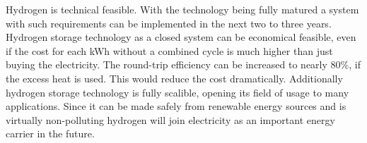 \documentclass[12pt,a4paper]{article}
\begin{document}
\begin{parcolumns}[colwidths={1=2.5 cm, 2=10 cm, 3=2.5cm}]{3}
{Hydrogen is technical feasible. With the technology being fully matured a system with such requirements can be implemented in the next two to three years. \\


Hydrogen storage technology as a closed system can be economical feasible, even if the cost for each kWh without a combined cycle is much higher than just buying the electricity. The round-trip efficiency can be increased to nearly 80\%, if the excess heat is used. This would reduce the cost dramatically. Additionally hydrogen storage technology is fully scalible, opening its field of usage to many applications. Since it can be made safely from renewable energy sources and is virtually non-polluting hydrogen will join electricity as an important energy carrier in the future.
}


\end{parcolumns}
\end{document}
